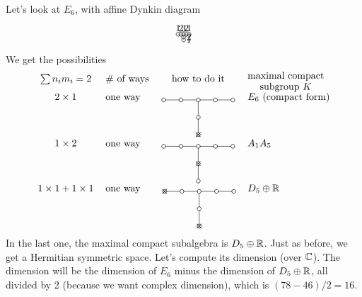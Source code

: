  \begin{example}
   Let's look at $E_6$, with affine Dynkin diagram
   \[\begin{xy}
   (0,0) *+!D{1} *\cir<2pt>{};
   (1,0) *+!D{2} *\cir<2pt>{} **@{-};
   p+(1,0)="y" *+!D{3} *\cir<2pt>{} **@{-};
       p+(0,-1) *+!L{2} *\cir<2pt>{} **@{-};
       p+(0,-1) *+!L{1} *\cir<2pt>{} **@{-};
   "y" *{\hspace{4pt}};p+(1,0) *+!D{2} *\cir<2pt>{} **@{-};
   p+(1,0) *+!D{1} *\cir<2pt>{} **@{-};
  \end{xy}\]
  We get the possibilities
    \[
   \begin{tabular}{clcl}
     $\sum n_im_i=2$ & \# of ways & how to do it & \txt{maximal compact\\ subgroup $K$}\\
     $2\times 1$ & one way &
       \begin{xy}<1.75em,0em>:
        (0,0) *\cir<2pt>{};
        p+(1,0) *\cir<2pt>{} **@{-};
        p+(1,0)="y" *\cir<2pt>{} **@{-};
            p+(0,-1) *\cir<2pt>{} **@{-};
            p+(0,-1) *{\times} *\cir<2pt>{} **@{-};
        "y" *{\hspace{4pt}};p+(1,0) *\cir<2pt>{} **@{-};
        p+(1,0) *\cir<2pt>{} **@{-};
       \end{xy} & $E_6$ (compact form)\\
     $1\times 2$ & one way&
       \begin{xy}<1.75em,0em>:
        (0,0) *\cir<2pt>{};
        p+(1,0) *\cir<2pt>{} **@{-};
        p+(1,0)="y" *\cir<2pt>{} **@{-};
            p+(0,-1) *{\times} *\cir<2pt>{} **@{-};
            p+(0,-1) *\cir<2pt>{} **@{-};
        "y" *{\hspace{4pt}};p+(1,0) *\cir<2pt>{} **@{-};
        p+(1,0) *\cir<2pt>{} **@{-};
       \end{xy} & $A_1A_5$\\
     $1\times 1+1\times 1$ & one way &
       \begin{xy}<1.75em,0em>:
        (0,0) *{\times} *\cir<2pt>{};
        p+(1,0) *\cir<2pt>{} **@{-};
        p+(1,0)="y" *\cir<2pt>{} **@{-};
            p+(0,-1) *\cir<2pt>{} **@{-};
            p+(0,-1) *{\times} *\cir<2pt>{} **@{-};
        "y" *{\hspace{4pt}};p+(1,0) *\cir<2pt>{} **@{-};
        p+(1,0) *\cir<2pt>{} **@{-};
       \end{xy} & $D_5\oplus \RR$\\
   \end{tabular}
   \]
%
%
%
%
   In the last one, the maximal compact subalgebra is $D_5\oplus \mathbb{R}$. Just as before,
   we get a Hermitian symmetric space. Let's compute its dimension (over $\mathbb{C}$). The
   dimension will be the dimension of $E_6$ minus the dimension of $D_5\oplus\mathbb{R}$, all
   divided by 2 (because we want complex dimension), which is $(78-46)/2=16$.


\end{example}
